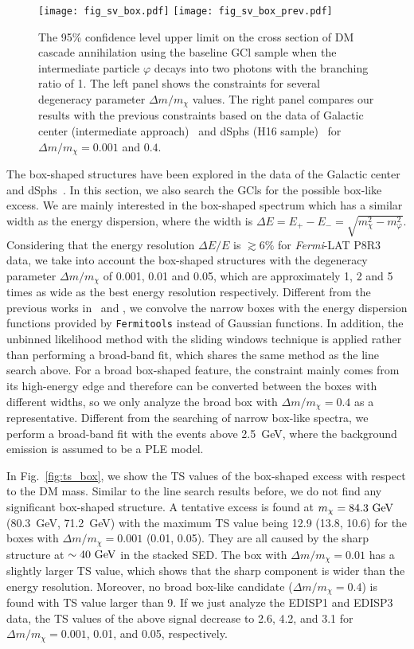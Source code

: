 \documentclass[
	twocolumn,
]{aastex6} %
\newcommand{\lat}{\emph{Fermi}-LAT\xspace}
\begin{document}
\begin{figure*}
	\centering
	\texttt{[image: fig\_sv\_box.pdf]}
	\texttt{[image: fig\_sv\_box\_prev.pdf]}
    \caption{\label{fig:sv_box}
		The 95\% confidence level upper limit on the cross section of DM cascade annihilation using the baseline GCl sample when the intermediate particle $\varphi$ decays into two photons with the branching ratio of 1.
		The left panel shows the constraints for several degeneracy parameter $\Delta m/m_\chi$ values.
		The right panel compares our results with the previous constraints based on the data of Galactic center (intermediate approach)~\citep{Ibarra2012} and dSphs (H16 sample)~\citep{LiS2018} for $\Delta m/m_\chi=0.001$ and $0.4$.
	}
\end{figure*}

The box-shaped structures have been explored in the data of the Galactic center~\citep{Ibarra2012,Ibarra2013} and dSphs~\citep{LiS2018}.
In this section, we also search the GCls for the possible box-like excess.
We are mainly interested in the box-shaped spectrum which has a similar width as the energy dispersion, where the width is $\Delta E = E_+ - E_- = \sqrt{m_\chi ^2-m_\varphi^2}$.
Considering that the energy resolution $\Delta E/E$ is $\gtrsim 6\%$ for \lat P8R3 data, we take into account the box-shaped structures with the degeneracy parameter $\Delta m/m_\chi$ of 0.001, 0.01 and 0.05, which are approximately 1, 2 and 5 times as wide as the best energy resolution respectively.
Different from the previous works in~\citet{Ibarra2012,Ibarra2013} and \citet{LiS2018}, we convolve the narrow boxes with the energy dispersion functions provided by {\tt Fermitools} instead of Gaussian functions.
In addition, the unbinned likelihood method with the sliding windows technique is applied rather than performing a broad-band fit, which shares the same method as the line search above.
For a broad box-shaped feature, the constraint mainly comes from its high-energy edge and therefore can be converted between the boxes with different widths, so we only analyze the broad box with $\Delta m/m_\chi=0.4$ as a representative.
Different from the searching of narrow box-like spectra, we perform a broad-band fit with the events above 2.5~GeV, where the background emission is assumed to be a PLE model.

In Fig.~\ref{fig:ts_box}, we show the TS values of the box-shaped excess with respect to the DM mass.
Similar to the line search results before, we do not find any significant box-shaped structure.
A tentative excess is found at $m_\chi=84.3~\rm GeV$ (80.3~GeV, 71.2~GeV) with the maximum TS value being 12.9 (13.8, 10.6) for the boxes with $\Delta m/m_\chi=0.001$ (0.01, 0.05).
They are all caused by the sharp structure at $\sim 40~\rm GeV$ in the stacked SED.
The box with $\Delta m/m_\chi=0.01$ has a slightly larger TS value, which shows that the sharp component is wider than the energy resolution.
Moreover, no broad box-like candidate ($\Delta m/m_\chi=0.4$) is found with TS value larger than 9.
If we just analyze the EDISP1 and EDISP3 data, the TS values of the above signal decrease to 2.6, 4.2, and 3.1 for $\Delta m/m_\chi=0.001$, 0.01, and 0.05, respectively.
\end{document}
